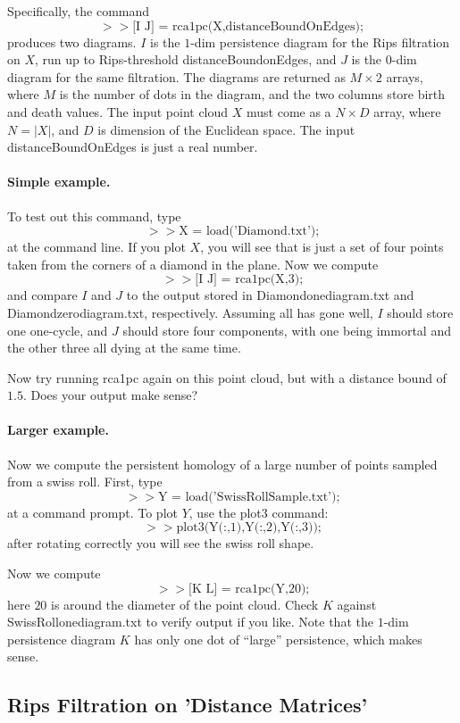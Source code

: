 \documentclass[a4paper,10pt]{article}
\begin{document}
Specifically, the command $$>> \mbox{[I J] = rca1pc(X,distanceBoundOnEdges)};$$
produces two diagrams. 
$I$ is the $1$-dim persistence diagram for the Rips filtration on $X$, run up to Rips-threshold distanceBoundonEdges,
and $J$ is the $0$-dim diagram for the same filtration.
The diagrams are returned as $M \times 2$ arrays, where $M$ is the number of dots in the diagram,
and the two columns store birth and death values.
The input point cloud $X$ must come as a $N \times D$ array, where $N = |X|$, and $D$ is dimension of the Euclidean space.
The input distanceBoundOnEdges is just a real number.

\paragraph{Simple example.}

To test out this command, type
$$ >> \mbox{X = load('Diamond.txt');}$$
at the command line.
If you plot $X$, you will see that is just a set of four points taken from the corners of a diamond in the plane.
Now we compute
$$ >> \mbox {[I J] = rca1pc(X,3);}$$
and compare $I$ and $J$ to the output stored in Diamondonediagram.txt and Diamondzerodiagram.txt, respectively.
Assuming all has gone well, $I$ should store one one-cycle, and $J$ should store four components, with one being immortal
and the other three all dying at the same time.

Now try running rca1pc again on this point cloud, but with a distance bound of $1.5$. Does your output make sense?

\paragraph{Larger example.}

Now we compute the persistent homology of a large number of points sampled from a swiss roll.
First, type
$$ >> \mbox{Y = load('SwissRollSample.txt');}$$
at a command prompt. To plot $Y$, use the plot3 command:
$$ >> \mbox{plot3(Y(:,1),Y(:,2),Y(:,3));}$$
after rotating correctly you will see the swiss roll shape.

Now we compute
$$ >> \mbox {[K L] = rca1pc(Y,20);}$$
here $20$ is around the diameter of the point cloud.
Check $K$ against SwissRollonediagram.txt to verify output if you like.
Note that the $1$-dim persistence diagram $K$ has only one dot of ``large'' persistence, which makes sense.

\subsection{Rips Filtration on 'Distance Matrices'}
\end{document}
